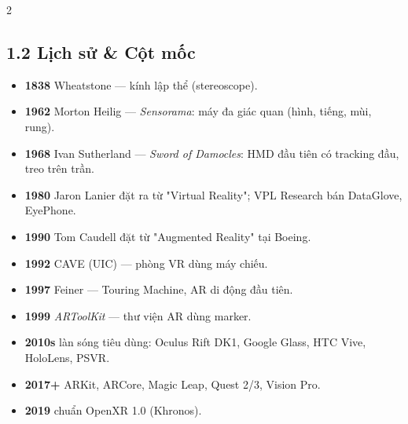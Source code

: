 \begin{paracol}{2}
\subsection*{1.2 Lịch sử \& Cột mốc}
\begin{itemize}[leftmargin=*,nosep]
  \item \textbf{1838} Wheatstone — kính lập thể (stereoscope).
  \item \textbf{1962} Morton Heilig — \emph{Sensorama}: máy đa giác quan (hình, tiếng, mùi, rung).
  \item \textbf{1968} Ivan Sutherland — \emph{Sword of Damocles}: HMD đầu tiên có tracking đầu, treo trên trần.
  \item \textbf{1980} Jaron Lanier đặt ra từ "Virtual Reality"; VPL Research bán DataGlove, EyePhone.
  \item \textbf{1990} Tom Caudell đặt từ "Augmented Reality" tại Boeing.
  \item \textbf{1992} CAVE (UIC) — phòng VR dùng máy chiếu.
  \item \textbf{1997} Feiner — Touring Machine, AR di động đầu tiên.
  \item \textbf{1999} \emph{ARToolKit} — thư viện AR dùng marker.
  \item \textbf{2010s} làn sóng tiêu dùng: Oculus Rift DK1, Google Glass, HTC Vive, HoloLens, PSVR.
  \item \textbf{2017+} ARKit, ARCore, Magic Leap, Quest 2/3, Vision Pro.
  \item \textbf{2019} chuẩn OpenXR 1.0 (Khronos).
\end{itemize}

\switchcolumn*


\end{paracol}
